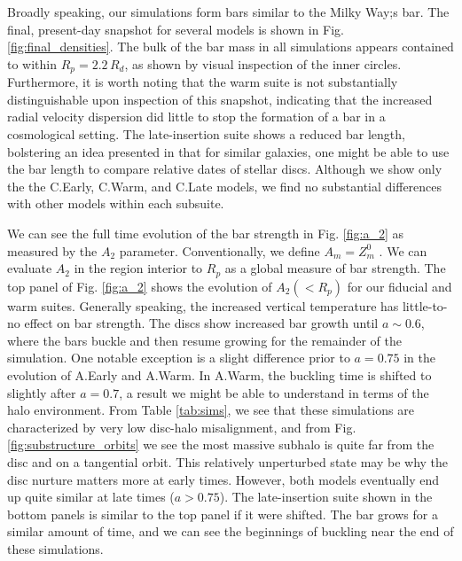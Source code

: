 
Broadly speaking, our simulations form bars similar to the Milky Way;s bar. The final, present-day snapshot for several models is shown in Fig. \ref{fig:final_densities}. The bulk of the bar mass in all simulations appears contained to within $R_p = 2.2\, R_d$, as shown by visual inspection of the inner circles. Furthermore, it is worth noting that the warm suite is not substantially distinguishable upon inspection of this snapshot, indicating that the increased radial velocity dispersion did little to stop the formation of a bar in a cosmological setting.   The late-insertion suite shows a reduced bar length, bolstering an idea presented in \citet{bauer2018b} that for similar galaxies, one might be able to use the bar length to compare relative dates of stellar discs. Although we show only the the C.Early, C.Warm, and C.Late models, we find no substantial differences with other models within each subsuite.


We can see the full time evolution of the bar strength in Fig. \ref{fig:a_2} as measured by the $A_2$ parameter. Conventionally, we define $A_m = Z^0_m$ \citep[for instance]{debattista_sellwood_2000}. We can evaluate $A_2$ in the region interior to $R_p$ as a global measure of bar strength. The top panel of Fig. \ref{fig:a_2} shows the evolution of $A_2(<R_p)$ for our fiducial and warm suites. Generally speaking, the increased vertical temperature has little-to-no effect on bar strength. The discs show increased bar growth until $a\sim0.6$, where the bars buckle and then resume growing for the remainder of the simulation. One notable exception is a slight difference prior to $a=0.75$ in the evolution of A.Early and A.Warm. In A.Warm, the buckling time is shifted to slightly after $a=0.7$, a result we might be able to understand in terms of the halo environment. From Table \ref{tab:sims}, we see that these simulations are characterized by very low disc-halo misalignment, and from Fig. \ref{fig:substructure_orbits} we see the most massive subhalo is quite far from the disc and on a tangential orbit. This relatively unperturbed state may be why the disc nurture matters more at early times. However, both models eventually end up quite similar at late times ($a>0.75$). The late-insertion suite shown in the bottom panels is similar to the top panel if it were shifted. The bar grows for a similar amount of time, and we can see the beginnings of buckling near the end of these simulations.
\\

